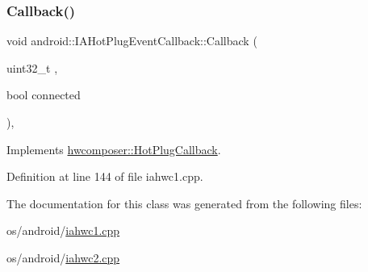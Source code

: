 \subsubsection{\texorpdfstring{Callback()}{Callback()}\hspace{0.1cm}{\footnotesize\ttfamily [2/2]}}
{\footnotesize\ttfamily void android\+::\+I\+A\+Hot\+Plug\+Event\+Callback\+::\+Callback (\begin{DoxyParamCaption}\item[{uint32\+\_\+t}]{,  }\item[{bool}]{connected }\end{DoxyParamCaption})\hspace{0.3cm}{\ttfamily [inline]}, {\ttfamily [virtual]}}



Implements \mbox{\hyperlink{classhwcomposer_1_1HotPlugCallback_a455c8913e1da9b165134a05c9cb441ba}{hwcomposer\+::\+Hot\+Plug\+Callback}}.



Definition at line 144 of file iahwc1.\+cpp.


\begin{DoxyCode}{0}
\end{DoxyCode}


The documentation for this class was generated from the following files\+:\begin{DoxyCompactItemize}
\item 
os/android/\mbox{\hyperlink{iahwc1_8cpp}{iahwc1.\+cpp}}\item 
os/android/\mbox{\hyperlink{iahwc2_8cpp}{iahwc2.\+cpp}}\end{DoxyCompactItemize}
